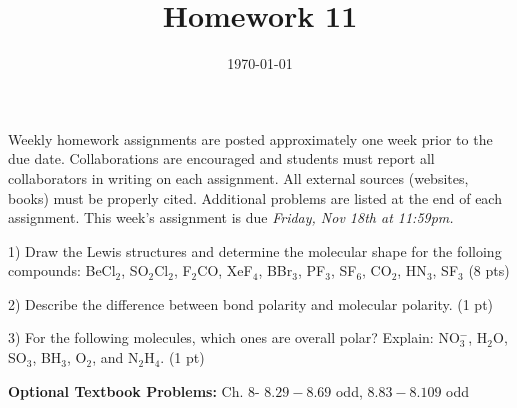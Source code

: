 \documentclass[12pt]{article}
\title{\textbf{Homework 11}}
\date{\vspace{-2em}\today}
\begin{document}
\maketitle 

Weekly homework assignments are posted approximately one week prior to the
due date. Collaborations are encouraged and students must report all collaborators
in writing on each assignment. All external sources (websites, books) must be
properly cited. Additional problems are listed at the end of each assignment.
This week's assignment is due \textit{Friday, Nov 18th at 11:59pm.}

1) Draw the Lewis structures and determine the molecular shape for the folloing
compounds: BeCl$_2$, SO$_2$Cl$_2$, F$_2$CO, XeF$_4$, BBr$_3$, PF$_3$, SF$_6$,
CO$_2$, HN$_3$, SF$_3$ (8 pts)
\vspace{2.3in}

2) Describe the difference between bond polarity and molecular polarity. (1 pt)
\vspace{1in}

3) For the following molecules, which ones are overall polar? Explain: NO$_3^-$,
H$_2$O, SO$_3$, BH$_3$, O$_2$, and N$_2$H$_4$. (1 pt)

\vfill

\textbf{Optional Textbook Problems:} Ch. 8- $8.29 - 8.69$ odd, $8.83 - 8.109$ odd
\end{document}
